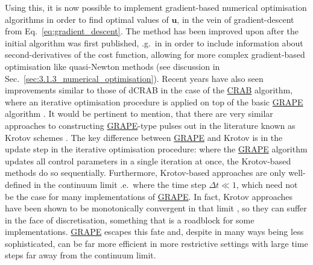 \documentclass[a4paper,oneside,11pt]{book}
\newcommand{\ubb}{\boldsymbol{u}}
\newcommand{\acrref}[1]{\hyperref[acr:#1]{#1}}
\begin{document}
Using this, it is now possible to implement gradient-based numerical optimisation algorithms in order to find optimal values of $\ubb$, in the vein of gradient-descent from Eq.~\ref{eq:gradient_descent}. The method has been improved upon after the initial algorithm was first published, \@e.g.~in \cite{machnes_comparing_2011} in order to include information about second-derivatives of the cost function, allowing for more complex gradient-based optimisation like quasi-Newton methods (see discussion in Sec.~\ref{sec:3.1.3_numerical_optimisation}). Recent years have also seen improvements similar to those of dCRAB in the case of the \acrref{CRAB} algorithm, where an iterative optimisation procedure is applied on top of the basic \acrref{GRAPE} algorithm \cite{chen_iterative_2022}. It would be pertinent to mention, that there are very similar approaches to constructing \acrref{GRAPE}-type pulses out in the literature known as Krotov schemes \cite{reich_monotonically_2012}. The key difference between \acrref{GRAPE} and Krotov is in the update step in the iterative optimisation procedure: where the \acrref{GRAPE} algorithm updates all control parameters in a single iteration at once, the Krotov-based methods do so sequentially. Furthermore, Krotov-based approaches are only well-defined in the continuum limit \@i.e.~where the time step $\Delta t \ll 1$, which need not be the case for many implementations of \acrref{GRAPE}. In fact, Krotov approaches have been shown to be monotonically convergent in that limit \cite{morzhin_krotov_2019}, so they can suffer in the face of discretisation, something that is a roadblock for some implementations. \acrref{GRAPE} escapes this fate and, despite in many ways being less sophisticated, can be far more efficient in more restrictive settings with large time steps far away from the continuum limit.
\end{document}
